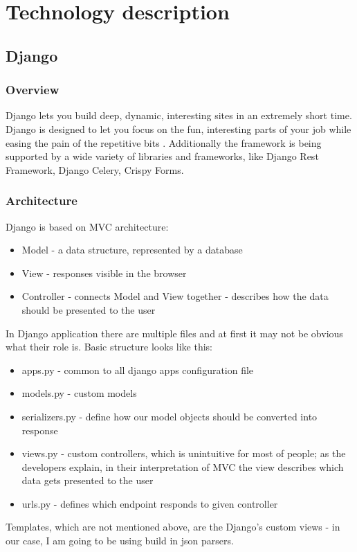 \chapter{Technology description}

\section{Django}

\subsection{Overview}
Django lets you build deep, dynamic, interesting sites in an extremely short time. Django is designed to let you focus on the fun, interesting parts of your job while easing the pain of the repetitive bits \cite{djangobook}. Additionally the framework is being supported by a wide variety of libraries and frameworks, like Django Rest Framework, Django Celery, Crispy Forms.

\subsection{Architecture}
Django is based on MVC architecture:
\begin{itemize}
    \item Model - a data structure, represented by a database
    \item View - responses visible in the browser
    \item Controller - connects Model and View together - describes how the data should be presented to the user
\end{itemize}
In Django application there are multiple files and at first it may not be obvious what their role is. Basic structure looks like this:
\begin{itemize}
    \item apps.py - common to all django apps configuration file
    \item models.py - custom models
    \item serializers.py - define how our model objects should be converted into response
    \item views.py - custom controllers, which is unintuitive for most of people; as the developers explain, in their interpretation of MVC the view describes which data gets presented to the user \cite{djangoWhyViews}
    \item urls.py - defines which endpoint responds to given controller
\end{itemize}
Templates, which are not mentioned above, are the Django's custom views - in our case, I am going to be using build in json parsers.

